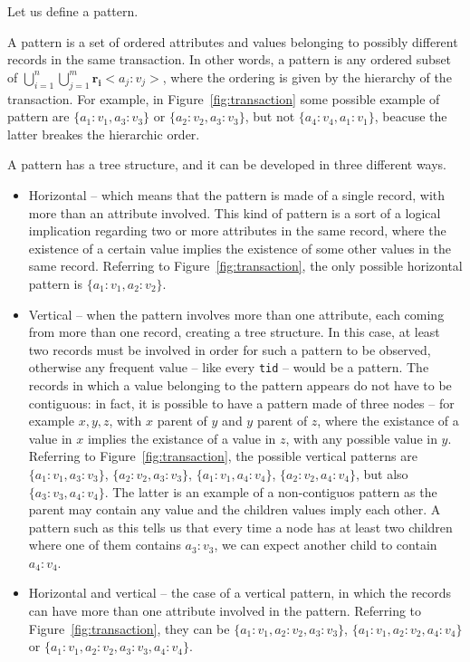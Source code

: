 \documentclass{acm_proc_article-sp-sigmod09}
\begin{document}
Let us define a pattern.
\begin{definition}
A pattern is a set of ordered attributes and values belonging to possibly different records in the same transaction. In other words, a pattern is any ordered subset of $\bigcup\limits_{i=1}^{n} \bigcup\limits_{j=1}^{m} \boldsymbol{r_i}<a_j \colon v_j>$, where the ordering is given by the hierarchy of the transaction. For example, in Figure~\ref{fig:transaction} some possible example of pattern are $\{a_1 \colon v_1, a_3 \colon v_3\}$ or $\{a_2 \colon v_2, a_3 \colon v_3\}$, but not $\{a_4 \colon v_4, a_1 \colon v_1\}$, beacuse the latter breakes the hierarchic order.

A pattern has a tree structure, and it can be developed in three different ways.
\begin{itemize}
\item Horizontal -- which means that the pattern is made of a single record, with more than an attribute involved. This kind of pattern is a sort of a logical implication regarding two or more attributes in the same record, where the existence of a certain value implies the existence of some other values in the same record. Referring to Figure~\ref{fig:transaction}, the only possible horizontal pattern is $\{a_1 \colon v_1, a_2 \colon v_2\}$.
\item Vertical -- when the pattern involves more than one attribute, each coming from more than one record, creating a tree structure. In this case, at least two records must be involved in order for such a pattern to be observed, otherwise any frequent value -- like every \texttt{tid} -- would be a pattern. The records in which a value belonging to the pattern appears do not have to be contiguous: in fact, it is possible to have a pattern made of three nodes -- for example $x, y, z$, with $x$ parent of $y$ and $y$ parent of $z$, where the existance of a value in $x$ implies the existance of a value in $z$, with any possible value in $y$. Referring to Figure~\ref{fig:transaction}, the possible vertical patterns are $\{a_1 \colon v_1, a_3 \colon v_3\}$, $\{a_2 \colon v_2, a_3 \colon v_3\}$, $\{a_1 \colon v_1, a_4 \colon v_4\}$, $\{a_2 \colon v_2, a_4 \colon v_4\}$, but also $\{a_3 \colon v_3, a_4 \colon v_4\}$. The latter is an example of a non-contiguos pattern as the parent may contain any value and the children values imply each other. A pattern such as this tells us that every time a node has at least two children where one of them contains $a_3 \colon v_3$, we can expect another child to contain $a_4 \colon v_4$.
\item Horizontal and vertical -- the case of a vertical pattern, in which the records can have more than one attribute involved in the pattern. Referring to Figure~\ref{fig:transaction}, they can be $\{a_1 \colon v_1, a_2 \colon v_2, a_3 \colon v_3\}$, $\{a_1 \colon v_1, a_2 \colon v_2, a_4 \colon v_4\}$ or $\{a_1 \colon v_1, a_2 \colon v_2, a_3 \colon v_3, a_4 \colon v_4\}$.
\end{itemize}
\end{definition}
\end{document}
